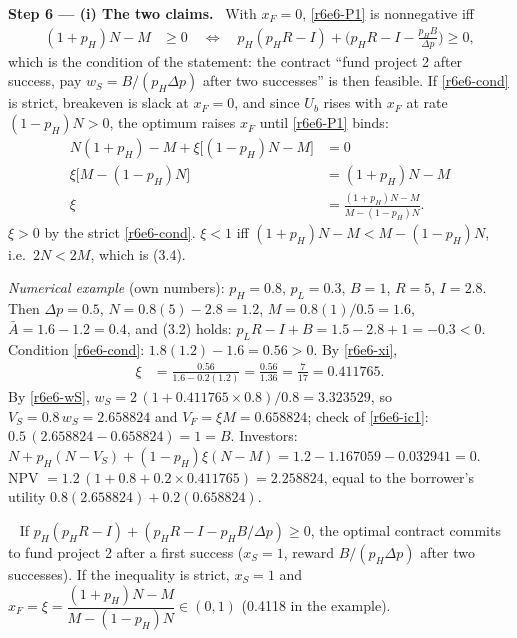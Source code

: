 \documentclass[11pt,a4paper]{article}
\newcommand{\step}[2]{\par\medskip\noindent\textbf{Step #1 --- #2.}~}
\newcommand{\answer}[1]{\par\smallskip\noindent\fbox{\textbf{Answer #1.}}~}
\begin{document}
\step{6}{(i) The two claims} With $x_F=0$, \eqref{r6e6-P1} is nonnegative iff
\begin{align}
  (1+p_H)N - M &\ge 0 \quad\Longleftrightarrow\quad p_H(p_HR-I)+\Big(p_HR-I-\frac{p_HB}{\Delta p}\Big)\ge 0, \label{r6e6-cond}
\end{align}
which is the condition of the statement: the contract ``fund project 2 after success, pay $w_S=B/(p_H\Delta p)$ after two successes'' is then feasible. If \eqref{r6e6-cond} is strict, breakeven is slack at $x_F=0$, and since $U_b$ rises with $x_F$ at rate $(1-p_H)N>0$, the optimum raises $x_F$ until \eqref{r6e6-P1} binds:
\begin{align}
  N(1+p_H) - M + \xi\big[(1-p_H)N-M\big] &= 0 \nonumber\\
  \xi\big[M-(1-p_H)N\big] &= (1+p_H)N - M \nonumber\\
  \xi &= \frac{(1+p_H)N-M}{M-(1-p_H)N}. \label{r6e6-xi}
\end{align}
$\xi>0$ by the strict \eqref{r6e6-cond}. $\xi<1$ iff $(1+p_H)N-M<M-(1-p_H)N$, i.e.\ $2N<2M$, which is (3.4).

\emph{Numerical example} (own numbers): $p_H=0.8$, $p_L=0.3$, $B=1$, $R=5$, $I=2.8$. Then $\Delta p=0.5$, $N=0.8(5)-2.8=1.2$, $M=0.8(1)/0.5=1.6$, $\bar A=1.6-1.2=0.4$, and (3.2) holds: $p_LR-I+B=1.5-2.8+1=-0.3<0$. Condition \eqref{r6e6-cond}: $1.8(1.2)-1.6=0.56>0$. By \eqref{r6e6-xi},
\begin{align}
  \xi &= \frac{0.56}{1.6-0.2(1.2)} = \frac{0.56}{1.36} = \frac{7}{17} = 0.411765. \nonumber
\end{align}
By \eqref{r6e6-wS}, $w_S=2\,(1+0.411765\times0.8)/0.8=3.323529$, so $V_S=0.8\,w_S=2.658824$ and $V_F=\xi M=0.658824$; check of \eqref{r6e6-ic1}: $0.5\,(2.658824-0.658824)=1=B$. Investors: $N+p_H(N-V_S)+(1-p_H)\xi(N-M)=1.2-1.167059-0.032941=0$. NPV $=1.2\,(1+0.8+0.2\times0.411765)=2.258824$, equal to the borrower's utility $0.8(2.658824)+0.2(0.658824)$.

\answer{(i)} If $p_H(p_HR-I)+(p_HR-I-p_HB/\Delta p)\ge0$, the optimal contract commits to fund project 2 after a first success ($x_S=1$, reward $B/(p_H\Delta p)$ after two successes). If the inequality is strict, $x_S=1$ and $x_F=\xi=\dfrac{(1+p_H)N-M}{M-(1-p_H)N}\in(0,1)$ (0.4118 in the example).
\end{document}
